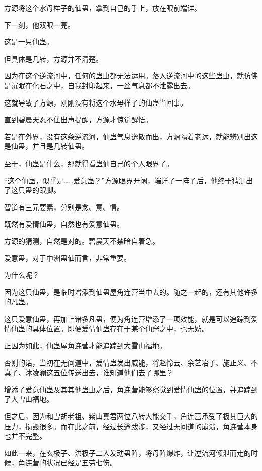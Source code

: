 
\begin{this_body}



方源将这个水母样子的仙蛊，拿到自己的手上，放在眼前端详。

下一刻，他双眼一亮。

这是一只仙蛊。

但具体是几转，方源并不清楚。

因为在这个逆流河中，任何的蛊虫都无法运用。落入逆流河中的这些蛊虫，就仿佛是沉眠在化石之中，自我封印起来，一丝气息都不泄露出去。

这就导致了方源，刚刚没有将这个水母样子的仙蛊当回事。

直到碧晨天忍不住出声提醒，方源才惊觉醒悟。

若是在外界，没有这条逆流河，仙蛊气息逸散而出，方源隔着老远，就能辨别出这是仙蛊，并且是几转仙蛊。

至于，仙蛊是什么，那就得看蛊仙自己的个人眼界了。

“这个仙蛊，似乎是……爱意蛊？”方源眼界开阔，端详了一阵子后，他终于猜测出了这只蛊的跟脚。

智道有三元要素，分别是念、意、情。

既然有爱情仙蛊，自然也有爱意仙蛊。

方源的猜测，自然是对的。碧晨天不禁暗自着急。

爱意蛊，对于中洲蛊仙而言，非常重要。

为什么呢？

因为这只仙蛊，是临时增添到仙蛊屋角连营当中去的。随之一起的，还有其他许多的凡蛊。

这只爱意仙蛊，再加上诸多凡蛊，便为角连营增添了一项效能，就是可以追踪到爱情仙蛊的具体位置。即便爱情仙蛊存在于某个仙窍之中，也无妨。

正因为如此，仙蛊屋角连营才能追踪到大雪山福地。

否则的话，当初在无间道中，爱情蛊发出威能，将赵怜云、余艺冶子、施正义、不真子、沐凌澜这五位传送出去，谁知道他们去了哪里？

增添了爱意仙蛊及其其他蛊虫之后，角连营能够察觉到爱情仙蛊的位置，并追踪到了大雪山福地。

但之后，因为和雪胡老祖、紫山真君两位八转大能交手，角连营承受了极其巨大的压力，损毁很多。而在此之前，经过长途跋涉，又经过无间道的崩溃，角连营本身也并不完整。

如此一来，在玄极子、洪极子二人发动蛊阵，将母阵爆炸，让逆流河倾泄而走的时候，角连营的状况已经是五劳七伤。


\end{this_body}
